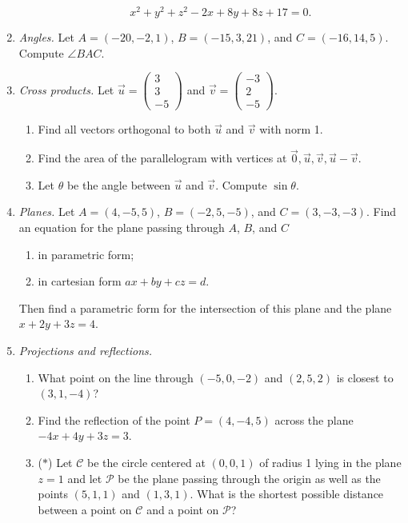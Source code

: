 \begin{enumerate}
\begin{enumerate}
\begin{equation*}
x^2 + y^2 + z^2 - 2x + 8y + 8z + 17 = 0.
\end{equation*}
\end{enumerate}
\item \emph{Angles.} Let $A = (-20,-2,1)$, $B = (-15,3,21)$, and $C = (-16,14,5)$. Compute $\angle BAC$.
\item \emph{Cross products.} Let $\vec{u} = \begin{pmatrix} 3 \\ 3 \\ -5 \end{pmatrix}$ and $\vec{v} = \begin{pmatrix} -3 \\ 2 \\ -5 \end{pmatrix}$.
\begin{enumerate}
\item Find all vectors orthogonal to both $\vec{u}$ and $\vec{v}$ with norm 1.
\item Find the area of the parallelogram with vertices at $\vec{0}, \vec{u}, \vec{v}, \vec{u} - \vec{v}$.
\item Let $\theta$ be the angle between $\vec{u}$ and $\vec{v}$. Compute $\sin\theta$.
\end{enumerate}
\item \emph{Planes.} Let $A = (4,-5,5)$, $B = (-2,5,-5)$, and $C = (3,-3,-3)$. Find an equation for the plane passing through $A$, $B$, and $C$
\begin{enumerate}
\item in parametric form;
\item in cartesian form $ax + by + cz = d$.
\end{enumerate}
Then find a parametric form for the intersection of this plane and the plane $x + 2y + 3z = 4$.
\newpage
\item \emph{Projections and reflections.}
\begin{enumerate}
\item What point on the line through $(-5,0,-2)$ and $(2,5,2)$ is closest to $(3,1,-4)$?
\item Find the reflection of the point $P = (4,-4,5)$ across the plane $-4x + 4y + 3z = 3$.
\item ($*$) Let $\mathcal{C}$ be the circle centered at $(0,0,1)$ of radius 1 lying in the plane $z = 1$ and let $\mathcal{P}$ be the plane passing through the origin as well as the points $(5,1,1)$ and $(1,3,1)$. What is the shortest possible distance between a point on $\mathcal{C}$ and a point on $\mathcal{P}$?

\end{enumerate}
\end{enumerate}
